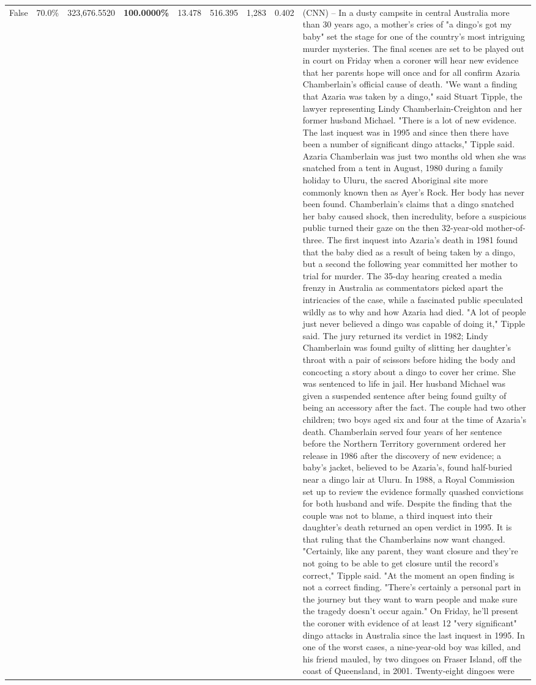 \begin{table}[H]
\begin{tabular}{lllrlllll}
False & 70.0\% & 323,676.5520 & \bfseries \color{red} 100.0000\% & 13.478 & 516.395 & 1,283 & 0.402 & (CNN) -- In a dusty campsite in central Australia more than 30 years ago, a mother's cries of "a dingo's got my baby" set the stage for one of the country's most intriguing murder mysteries. The final scenes are set to be played out in court on Friday when a coroner will hear new evidence that her parents hope will once and for all confirm Azaria Chamberlain's official cause of death. "We want a finding that Azaria was taken by a dingo," said Stuart Tipple, the lawyer representing Lindy Chamberlain-Creighton and her former husband Michael. "There is a lot of new evidence. The last inquest was in 1995 and since then there have been a number of significant dingo attacks," Tipple said. Azaria Chamberlain was just two months old when she was snatched from a tent in August, 1980 during a family holiday to Uluru, the sacred Aboriginal site more commonly known then as Ayer's Rock. Her body has never been found. Chamberlain's claims that a dingo snatched her baby caused shock, then incredulity, before a suspicious public turned their gaze on the then 32-year-old mother-of-three. The first inquest into Azaria's death in 1981 found that the baby died as a result of being taken by a dingo, but a second the following year committed her mother to trial for murder. The 35-day hearing created a media frenzy in Australia as commentators picked apart the intricacies of the case, while a fascinated public speculated wildly as to why and how Azaria had died. "A lot of people just never believed a dingo was capable of doing it," Tipple said. The jury returned its verdict in 1982; Lindy Chamberlain was found guilty of slitting her daughter's throat with a pair of scissors before hiding the body and concocting a story about a dingo to cover her crime. She was sentenced to life in jail. Her husband Michael was given a suspended sentence after being found guilty of being an accessory after the fact. The couple had two other children; two boys aged six and four at the time of Azaria's death. Chamberlain served four years of her sentence before the Northern Territory government ordered her release in 1986 after the discovery of new evidence; a baby's jacket, believed to be Azaria's, found half-buried near a dingo lair at Uluru. In 1988, a Royal Commission set up to review the evidence formally quashed convictions for both husband and wife. Despite the finding that the couple was not to blame, a third inquest into their daughter's death returned an open verdict in 1995. It is that ruling that the Chamberlains now want changed. "Certainly, like any parent, they want closure and they're not going to be able to get closure until the record's correct," Tipple said. "At the moment an open finding is not a correct finding. "There's certainly a personal part in the journey but they want to warn people and make sure the tragedy doesn't occur again." On Friday, he'll present the coroner with evidence of at least 12 "very significant" dingo attacks in Australia since the last inquest in 1995. In one of the worst cases, a nine-year-old boy was killed, and his friend mauled, by two dingoes on Fraser Island, off the coast of Queensland, in 2001. Twenty-eight dingoes were 
\end{tabular}
\end{table}
